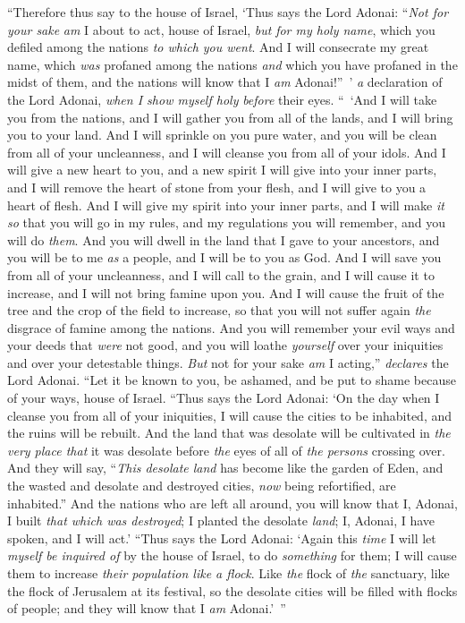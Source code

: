 \begin{biblechapter}
\verse “Therefore thus say to the house of Israel, ‘Thus says the Lord Adonai: “\textit{Not for your sake}  \textit{am} I about to act, house of Israel, \textit{but} \textit{for my holy name}, which you defiled among the nations \textit{to which you went}.
\verse And I will consecrate my great name, which \textit{was} profaned among the nations \textit{and} which you have profaned in the midst of them, and the nations will know that I \textit{am} Adonai!” ’ \textit{a} declaration of the Lord Adonai, \textit{when I show myself holy} \textit{before} their eyes.
\verse “ ‘And I will take you from the nations, and I will gather you from all of the lands, and I will bring you to your land.
\verse And I will sprinkle on you pure water, and you will be clean from all of your uncleanness, and I will cleanse you from all of your idols.
\verse And I will give a new heart to you, and a new spirit I will give into your inner parts, and I will remove the heart of stone from your flesh, and I will give to you a heart of flesh.
\verse And I will give my spirit into your inner parts, and I will make \textit{it} \textit{so} that you will go in my rules, and my regulations you will remember, and you will do \textit{them}.
\verse And you will dwell in the land that I gave to your ancestors, and you will be to me \textit{as} a people, and I will be to you as God.
\verse And I will save you from all of your uncleanness, and I will call to the grain, and I will cause it to increase, and I will not bring famine upon you.
\verse And I will cause the fruit of the tree and the crop of the field to increase, so that you will not suffer again \textit{the} disgrace of famine among the nations.
\verse And you will remember your evil ways and your deeds that \textit{were} not good, and you will loathe \textit{yourself} over your iniquities and over your detestable things.
\verse \textit{But} not for your sake \textit{am} I acting,” \textit{declares} the Lord Adonai. “Let it be known to you, be ashamed, and be put to shame because of your ways, house of Israel.
\verse “Thus says the Lord Adonai: ‘On the day when I cleanse you from all of your iniquities, I will cause the cities to be inhabited, and the ruins will be rebuilt.
\verse And the land that was desolate will be cultivated in \textit{the very place that} it was desolate before \textit{the} eyes of all of \textit{the persons} crossing over.
\verse And they will say, “\textit{This desolate land} has become like the garden of Eden, and the wasted and desolate and destroyed cities, \textit{now} being refortified, are inhabited.”
\verse And the nations who are left all around, you will know that I, Adonai, I built \textit{that which was destroyed}; I planted the desolate \textit{land}; I, Adonai, I have spoken, and I will act.’
\verse “Thus says the Lord Adonai: ‘Again this \textit{time} I will let \textit{myself be inquired of} by the house of Israel, to do \textit{something} for them; I will cause them to increase \textit{their population like a flock}.
\verse Like \textit{the} flock of \textit{the} sanctuary, like the flock of Jerusalem at its festival, so the desolate cities will be filled with flocks of people; and they will know that I \textit{am} Adonai.’ ”
\end{biblechapter}

